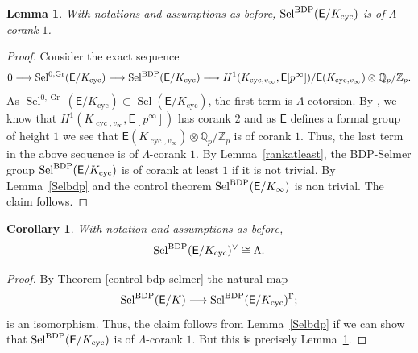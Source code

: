 \documentclass{amsart}
\newtheorem{lemma}[theorem]{Lemma}
\newtheorem{corollary}[theorem]{Corollary}
\numberwithin{equation}{section}
\theoremstyle{remark}
\newcommand{\cyc}{\operatorname{cyc}}
\newcommand{\Sel}{\operatorname{Sel}}
\newcommand{\Gr}{\operatorname{Gr}}
\newcommand{\SelBDP}{\operatorname{Sel}^{\textup{BDP}}}
\newcommand{\Z}{\mathbb{Z}}
\newcommand{\Q}{\mathbb{Q}}
\newcommand{\EC}{\mathsf{E}}
\theoremstyle{plain} %
\begin{document}
\begin{lemma}
\label{non-cotorsion}
With notations and assumptions as before, $\SelBDP(\EC/K_{\cyc})$ is of $\Lambda$-corank $1$.
\end{lemma}

\begin{proof}
Consider the exact sequence
\[
0\longrightarrow \Sel^{0,\Gr}(\EC/K_{\cyc})\longrightarrow \SelBDP(\EC/K_{\cyc})\longrightarrow H^1(K_{\cyc,v_\infty},\EC[p^\infty])/\EC(K_{\cyc,v_\infty})\otimes \Q_p/\Z_p.
\]
As $\Sel^{0,\Gr}(\EC/K_{\cyc})\subset \Sel(\EC/K_{\cyc})$, the first term is $\Lambda$-cotorsion.
By \cite[Proposition 1]{greenberg}, we know that $H^1(K_{\cyc,v_\infty},\EC[p^\infty])$ has corank $2$ and as $\EC$ defines a formal group of height $1$ we see that $\EC(K_{\cyc,v_\infty})\otimes \Q_p/\Z_p$ is of corank $1$.
Thus, the last term in the above sequence is of $\Lambda$-corank $1$.
By Lemma~\ref{rankatleast}, the BDP-Selmer group $\SelBDP(\EC/K_{\cyc})$ is of corank at least $1$ if it is not trivial.
By Lemma~\ref{Selbdp} and the control theorem  $\SelBDP(\EC/K_\infty)$ is non trivial.
The claim follows.
\end{proof}

\begin{corollary}
With notation and assumptions as before,
\[
\SelBDP(\EC/K_{\cyc})^\vee\cong \Lambda.
\]
\end{corollary}

\begin{proof}
By Theorem \ref{control-bdp-selmer} the natural map 
\[
\SelBDP(\EC/K) \longrightarrow \SelBDP(\EC/K_{\cyc})^\Gamma;
\]
is an isomorphism.
Thus, the claim follows from Lemma~\ref{Selbdp} if we can show that $\SelBDP(\EC/K_{\cyc})$ is of $\Lambda$-corank $1$.
But this is precisely Lemma~\ref{non-cotorsion}.
\end{proof}
\end{document}
